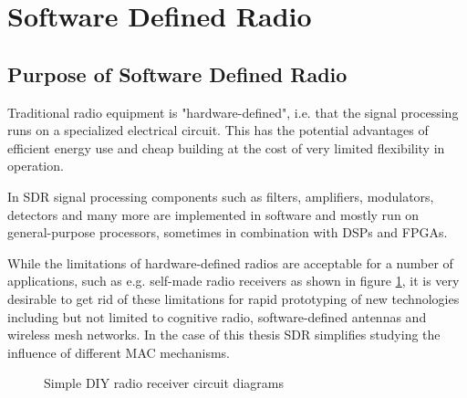 \section{Software Defined Radio}
 
\subsection{Purpose of Software Defined Radio}

Traditional radio equipment is "hardware-defined", i.e. that the signal processing runs on a specialized electrical circuit. This has the potential advantages of efficient energy use and cheap building at the cost of very limited flexibility in operation. 

In SDR signal processing components such as filters, amplifiers, modulators, detectors and many more are implemented in software and mostly run on general-purpose processors, sometimes in combination with DSPs and FPGAs.

While the limitations of hardware-defined radios are acceptable for a number of applications, such as e.g. self-made radio receivers as shown in figure \ref{fig:radio-receiver-circuits}, it is very desirable to get rid of these limitations for rapid prototyping of new technologies including but not limited to cognitive radio, software-defined antennas and wireless mesh networks. In the case of this thesis SDR simplifies studying the influence of different MAC mechanisms.

\begin{figure}[t]
	\label{fig:radio-receiver-circuits}
	\begin{center}
		\qquad
	\end{center}
	\caption{Simple DIY radio receiver circuit diagrams}
\end{figure}

